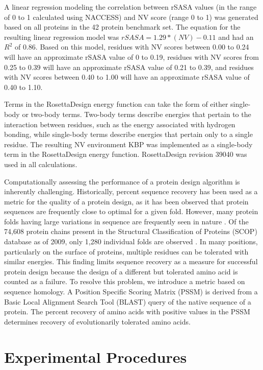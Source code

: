 A linear regression modeling the correlation between rSASA values (in the range of 0 to 1 calculated using NACCESS) and NV score (range 0 to 1) was generated based on all proteins in the 42 protein benchmark set.
The equation for the resulting linear regression model was $rSASA = 1.29*(NV)-0.11$ and had an $R^{2}$ of 0.86.
Based on this model, residues with NV scores between 0.00 to 0.24 will have an approximate rSASA value of 0 to 0.19, residues with NV scores from 0.25 to 0.39 will have an approximate rSASA value of 0.21 to 0.39, and residues with NV scores between 0.40 to 1.00 will have an approximate rSASA value of 0.40 to 1.10.

Terms in the RosettaDesign energy function can take the form of either single-body or two-body terms.
Two-body terms describe energies that pertain to the interaction between residues, such as the energy associated with hydrogen bonding, while single-body terms describe energies that pertain only to a single residue.
The resulting NV environment KBP was implemented as a single-body term in the RosettaDesign energy function.
RosettaDesign revision 39040 was used in all calculations.  

Computationally assessing the performance of a protein design algorithm is inherently challenging.
Historically, percent sequence recovery has been used as a metric for the quality of a protein design, as it has been observed that protein sequences are frequently close to optimal for a given fold\citep{Kuhlman:2000tc}.
However, many protein folds having large variations in sequence are frequently seen in nature \citep{Chothia:1986tm}.
Of the 74,608 protein chains present in the Structural Classification of Proteins (SCOP) database as of 2009, only 1,280 individual folds are observed \citep{Schaeffer:2011fe}.
In many positions, particularly on the surface of proteins, multiple residues can be tolerated with similar energies.
This finding limits sequence recovery as a measure for successful protein design because the design of a different but tolerated amino acid is counted as a failure.
To resolve this problem, we introduce a metric based on sequence homology. A Position Specific Scoring Matrix (PSSM) is derived from a Basic Local Alignment Search Tool (BLAST) query of the native sequence of a protein.
The percent recovery of amino acids with positive values in the PSSM determines recovery of evolutionarily tolerated amino acids. 

\section{Experimental Procedures}

